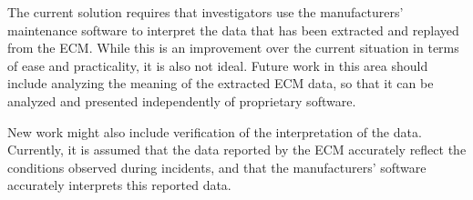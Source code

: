 The current solution requires that investigators use the manufacturers' maintenance software to interpret the data that has been extracted and replayed from the ECM.
While this is an improvement over the current situation in terms of ease and practicality, it is also not ideal. Future work in this area should include analyzing the
meaning of the extracted ECM data, so that it can be analyzed and presented independently of proprietary software.


New work might also include verification of the interpretation of the data. Currently, it is assumed that the data reported by the ECM accurately reflect the conditions
observed during incidents, and that the manufacturers' software accurately interprets this reported data. 

